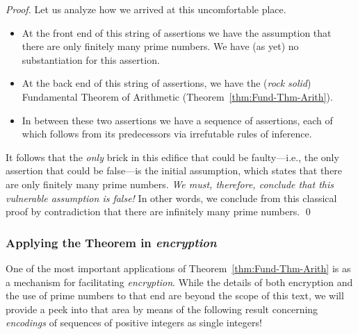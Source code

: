 \begin{proof}
Let us analyze how we arrived at this uncomfortable place.
\begin{itemize}
\item
At the front end of this string of assertions we have the assumption
that there are only finitely many prime numbers.  We have (as yet) no
substantiation for this assertion.
\item
At the back end of this string of assertions, we have the ({\em rock
  solid}) Fundamental Theorem of Arithmetic
(Theorem~\ref{thm:Fund-Thm-Arith}).
\item
In between these two assertions we have a sequence of assertions, each
of which follows from its predecessors via irrefutable rules of
inference.
\end{itemize}
It follows that the {\em only} brick in this edifice that could be
faulty---i.e., the only assertion that could be false---is the initial
assumption, which states that there are only finitely many prime
numbers.  {\em We must, therefore, conclude that this vulnerable
  assumption is false!}  In other words, we conclude from this
classical proof by contradiction that there are infinitely many prime
numbers.  \qed
\end{proof}


\subsubsection{Applying the Theorem in {\em encryption}}
\label{sec:apply-FTA}

One of the most important applications of Theorem~\ref{thm:Fund-Thm-Arith} is
as a mechanism for facilitating {\em encryption}.
%
While the details of both encryption and the use of prime numbers to
that end are beyond the scope of this text, we will provide a peek
into that area by means of the following result concerning {\it
  encodings} of sequences of positive integers as single integers!
\bigskip

\noindent {}
\bigskip

